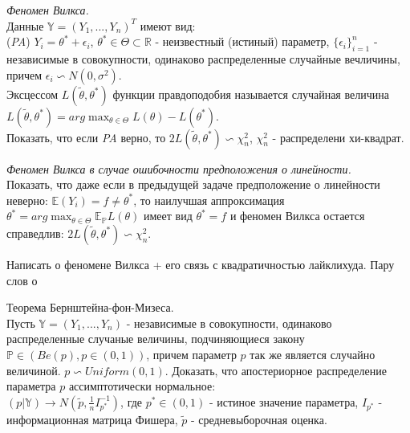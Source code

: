 \begin{problem} \textit{Феномен Вилкса.}\\
Данные $\mathbb{Y} = (Y_1,..., Y_n)^T$ имеют вид:\\
(\textit{PA}) $Y_i = \theta^* + \epsilon_i$, $\theta^* \in \Theta \subset \mathbb{R}$ - неизвестный (истиный) параметр, $\{\epsilon_i\}_{i=1}^n$ - независимые в совокупности, одинаково распределенные случайные вечличины, причем $\epsilon_i \backsim N(0, \sigma^2)$.\\
Эксцессом $L(\tilde{\theta}, \theta^*)$ функции правдоподобия называется случайная величина $L(\tilde{\theta}, \theta^*) = arg\max_{\theta \in \Theta}L(\theta) - L(\theta^*)$.\\
Показать, что если \textit{PA} верно, то $2L(\tilde{\theta}, \theta^*) \backsim \chi_n^2$, $\chi_n^2$ - распределени хи-квадрат. 
\end{problem}

\begin{problem} \textit{Феномен Вилкса в случае ошибочности предположения о линейности.}\\
Показать, что даже если в предыдущей задаче предположение о линейности неверно: $\mathbb{E}(Y_i) = f \not= \theta^*$, то наилучшая аппроксимация $\theta^* = arg\max_{\theta \in \Theta} \mathbb{E}_{\mathbb{P} }L(\theta)$ имеет вид $\theta^* = f$ и феномен Вилкса остается справедлив: $2L(\tilde{\theta}, \theta^*) \backsim \chi_n^2$.
\end{problem}
\begin{remark} Написать о феномене Вилкса + его связь с квадратичностью лайклихуда. Пару слов о 
\end{remark}

\begin{problem} Теорема Бернштейна-фон-Мизеса.\\
Пусть $\mathbb{Y} = (Y_1, ..., Y_n)$ - независимые в совокупности, одинаково распределенные случаные величины, подчиняющиеся закону $\mathbb{P} \in (Be(p), p \in (0, 1))$, причем параметр $p$ так же является случайно величиной. $p \backsim Uniform(0,1)$. Доказать, что апостериорное распределение параметра $p$ ассимптотически нормальное:\\
$(p|\mathbb{Y}) \rightarrow N(\tilde{p}, \frac{1}{n}I_{p^*}^{-1})$, где $p^* \in (0, 1)$ - истиное значение параметра, $I_{p^*}$ - информационная матрица Фишера, $\tilde{p}$ - средневыборочная оценка.
\begin{ordre}
\end{ordre}
\end{problem}

